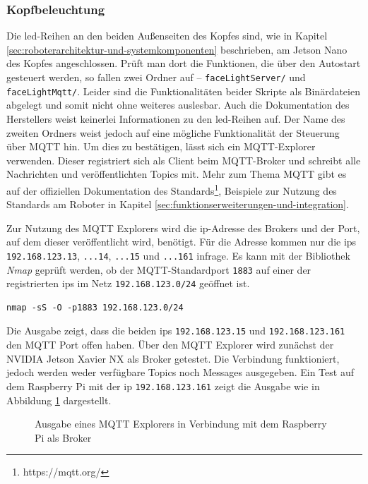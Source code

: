 \subsubsection{Kopfbeleuchtung}
\label{subsubsec:led}

Die \gls{led}-Reihen an den beiden Außenseiten des Kopfes sind, wie in Kapitel \ref{sec:roboterarchitektur-und-systemkomponenten}
beschrieben, am Jetson Nano des Kopfes angeschlossen.
Prüft man dort die Funktionen, die über den Autostart gesteuert werden, so fallen zwei Ordner auf -- \texttt{faceLightServer/}
und \texttt{faceLightMqtt/}.
Leider sind die Funktionalitäten beider Skripte als Binärdateien abgelegt und somit nicht ohne weiteres auslesbar.
Auch die Dokumentation des Herstellers weist keinerlei Informationen zu den \gls{led}-Reihen auf.
Der Name des zweiten Ordners weist jedoch auf eine mögliche Funktionalität der Steuerung über MQTT hin.
Um dies zu bestätigen, lässt sich ein MQTT-Explorer verwenden.
Dieser registriert sich als Client beim MQTT-Broker und schreibt alle Nachrichten und veröffentlichten Topics mit.
Mehr zum Thema MQTT gibt es auf der offiziellen Dokumentation des Standards\footnote{https://mqtt.org/}, Beispiele zur Nutzung
des Standards am Roboter in Kapitel \ref{sec:funktionserweiterungen-und-integration}.

Zur Nutzung des MQTT Explorers wird die \gls{ip}-Adresse des Brokers und der Port, auf dem dieser veröffentlicht wird, benötigt.
Für die Adresse kommen nur die \glspl{ip} \texttt{192.168.123.13}, \texttt{...14}, \texttt{...15} und \texttt{...161}
infrage.
Es kann mit der Bibliothek \emph{Nmap} geprüft werden, ob der MQTT-Standardport \texttt{1883} auf einer der registrierten \glspl{ip}
im Netz \texttt{192.168.123.0/24} geöffnet ist.

\begin{lstlisting}
nmap -sS -O -p1883 192.168.123.0/24
\end{lstlisting}

\noindent Die Ausgabe zeigt, dass die beiden \glspl{ip}
\texttt{192\allowbreak .168\allowbreak .123\allowbreak .15} und \texttt{192\allowbreak .168\allowbreak .123\allowbreak .161} den MQTT Port offen haben.
Über den MQTT Explorer wird zunächst der NVIDIA Jetson Xavier NX als Broker getestet.
Die Verbindung funktioniert, jedoch werden weder verfügbare Topics noch Messages ausgegeben.
Ein Test auf dem Raspberry Pi mit der \gls{ip} \texttt{192.168.123.161} zeigt die Ausgabe wie in Abbildung \ref{fig:mqtt-explorer}
dargestellt.

\begin{figure}[h]
    \caption{Ausgabe eines MQTT Explorers in Verbindung mit dem Raspberry Pi als Broker}\label{fig:mqtt-explorer}
\end{figure}

